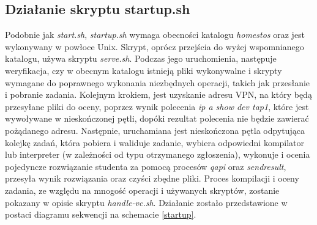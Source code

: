 \subsection{Działanie skryptu startup.sh}
Podobnie jak \textit{start.sh}, \textit{startup.sh} wymaga obecności katalogu \textit{\/home\/stos} oraz jest wykonywany w powłoce Unix. Skrypt, oprócz przejścia do wyżej wspomnianego katalogu, używa skryptu \textit{serve.sh}. Podczas jego uruchomienia, następuje weryfikacja, czy w obecnym katalogu istnieją pliki wykonywalne i skrypty wymagane do poprawnego wykonania niezbędnych operacji, takich jak przesłanie i pobranie zadania. Kolejnym krokiem, jest uzyskanie adresu VPN, na który będą przesyłane pliki do oceny, poprzez wynik polecenia \textit{ip a show dev tap1}\cite{ip_addr}, które jest wywoływane w nieskończonej pętli, dopóki rezultat polecenia nie będzie zawierać pożądanego adresu. Następnie, uruchamiana jest nieskończona pętla odpytująca kolejkę zadań, która pobiera i waliduje zadanie, wybiera odpowiedni kompilator lub interpreter (w zależności od typu otrzymanego zgłoszenia), wykonuje i ocenia pojedyncze rozwiązanie studenta za pomocą procesów \textit{qapi} oraz \textit{sendresult}, przesyła wynik rozwiązania oraz czyści zbędne pliki. Proces kompilacji i oceny zadania, ze względu na mnogość operacji i używanych skryptów, zostanie pokazany w opisie skryptu \textit{handle-vc.sh}. Działanie zostało przedstawione w postaci diagramu sekwencji na schemacie \ref{startup}.
